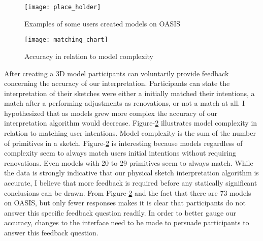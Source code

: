 \begin{figure}[h]
	\centering
	\texttt{[image: place\_holder]}
	\caption{Examples of some users created models on OASIS}
	\label{fig:examples}
\end{figure}

\begin{figure}[h]
	\centering
	\texttt{[image: matching\_chart]}
	\caption{Accuracy in relation to model complexity}
	\label{fig:matching_chart}
\end{figure}

After creating a 3D model participants can voluntarily provide feedback concerning the accuracy of our interpretation.
Participants can state the interpretation of their sketches were either a initially matched their intentions, a match after a performing adjustments as renovations, or not a match at all.
I hypothesized that as models grew more complex the accuracy of our interpretation algorithm would decrease.
Figure-\ref{fig:matching_chart} illustrates model complexity in relation to matching user intentions.
Model complexity is the sum of the number of primitives in a sketch.
Figure-\ref{fig:matching_chart} is interesting because models regardless of complexity seem to always match users initial intentions without requiring renovations.
Even models with 20 to 29 primitives seem to always match.
While the data is strongly indicative that our physical sketch interpretation algorithm is accurate, I believe that more feedback is required before any statically significant conclusions can be drawn.
From Figure-\ref{fig:matching_chart} and the fact that there are 73 models on OASIS, but only fewer responses makes it is clear that participants do not answer this specific feedback question readily.
In order to better gauge our accuracy, changes to the interface need to be made to persuade participants to answer this feedback question. \\


